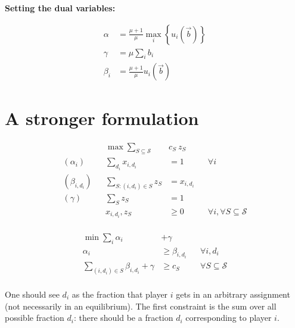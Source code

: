 \documentclass[11pt,a4paper]{article}
\begin{document}
\vspace{1cm}
\textbf{Setting the dual variables:}

\begin{minipage}[t]{0.3\textwidth}
\begin{align*}
    \alpha &= \frac{\mu+1}{\mu} \max_i \left\{ u_i(\vec{b}) \right\} \\
    \gamma &= \mu \sum_{i} b_i \\
    \beta_i &= \frac{\mu+1}{\mu} u_i(\vec{b})
\end{align*}
\end{minipage}
\begin{minipage}[t]{0.6\textwidth}
\end{minipage}

\section{A stronger formulation}

\begin{minipage}[t]{0.59\textwidth}
	\begin{align*}
		&& \max  \sum_{S \subseteq \mathcal{S}} &c_{S}\ z_{S} \\
		(\alpha_{i}) && \sum_{d_{i}}  x_{i,d_{i}} &= 1 & & \forall i \\
		(\beta_{i,d_{i}}) && \sum_{S: (i,d_{i}) \in S } z_{S} &= x_{i,d_{i}} & & \\
		(\gamma) && \sum_{S} z_{S}  &= 1	& & \\
		&& x_{i,d_{i}}, z_{S} &\geq 0 & & \forall i, \forall S \subseteq \mathcal{S}\\
	\end{align*}
\end{minipage}
\begin{minipage}[t]{0.3\textwidth}
	\begin{align*}
		\min \sum_{i} \alpha_{i} &+ \gamma \\
		\alpha_{i} &\ge \beta_{i,d_{i}}  & &   \forall i,d_{i} \\
		\sum_{(i,d_{i}) \in S} \beta_{i,d_{i}} + \gamma &\geq c_{S}  & & \forall S \subseteq \mathcal{S}\\
\end{align*}
\end{minipage}
%
One should see $d_{i}$ as the fraction that player $i$ gets in an arbitrary assignment (not necessarily in an equilibrium). 
The first constraint is the sum over all possible fraction $d_{i}$: there should be a fraction $d_{i}$ corresponding to player $i$. 
\end{document}
